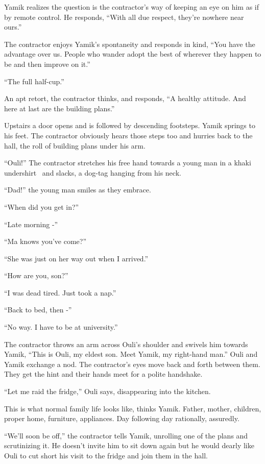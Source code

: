 \documentclass[twoside,11pt]{book}
\begin{document}
Yamik realizes the question is the contractor's way of keeping an eye on him as if by remote control. He responds,
``With all due respect, they're nowhere near ours.''

The contractor enjoys Yamik's spontaneity and responds in kind, ``You have the advantage over us. People
who wander adopt the best of wherever they happen to be and then improve on it.''

``The full half-cup.''

An apt retort, the contractor thinks, and responds, ``A healthy attitude. And here at last are the
building plans.''

Upstairs a door opens and is followed by descending footsteps. Yamik springs to his feet. The contractor obviously hears
those steps too and hurries back to the hall, the roll of building plans under his arm.

``Ouli!'' The contractor stretches his free hand towards a young man in a khaki undershirt
\ and slacks, a dog-tag hanging from his neck.

``Dad!'' the young man smiles as they embrace.

``When did you get in?''

``Late morning -''

``Ma knows you've come?''

``She was just on her way out when I arrived.''

``How are you, son?''

``I was dead tired. Just took a nap.''

``Back to bed, then -''

``No way. I have to be at university.''

The contractor throws an arm across Ouli's shoulder and swivels him towards Yamik, ``This is Ouli, my
eldest son. Meet Yamik, my right-hand man.'' Ouli and Yamik exchange a nod. The contractor's eyes move
back and forth between them. They get the hint and their hands meet for a polite handshake.

``Let me raid the fridge,'' Ouli says, disappearing into the kitchen.

This is what normal family life looks like, thinks Yamik. Father, mother, children, proper home, furniture, appliances.
Day following day rationally, assuredly.

``We'll soon be off,'' the contractor tells Yamik, unrolling one of the plans and scrutinizing
it. He doesn't invite him to sit down again but he would dearly like Ouli to cut short his visit to the fridge and join
them in the hall.
\end{document}
